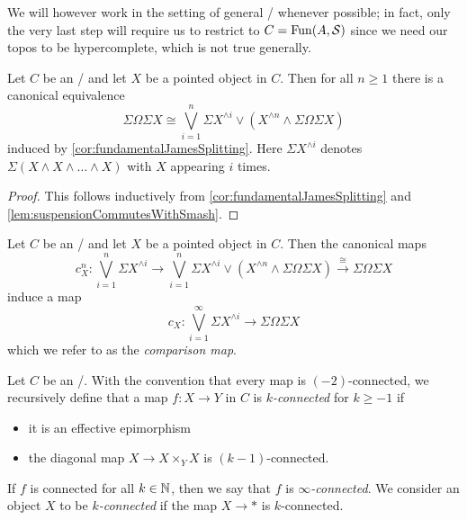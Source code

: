 We will however work in the setting of general \inftytops/ whenever possible; 
in fact, only the very last step will require us to restrict to $C=\operatorname{Fun}(A,\mathcal{S})$ since we need our topos to be hypercomplete, which is not true generally.
\begin{corollary}
    Let $C$ be an \inftytop/ and let $X$ be a pointed object in $C$. 
    Then for all $n\geq 1$ there is a canonical equivalence
    \begin{equation*}
        \Sigma\Omega\Sigma X \cong\bigvee\limits_{i=1}^n\Sigma X^{\wedge i}\vee\left(X^{\wedge n}\wedge\Sigma\Omega\Sigma X\right)
    \end{equation*}
    induced by \cref{cor:fundamentalJamesSplitting}.
    Here $\Sigma X^{\wedge i}$ denotes $\Sigma\left(X\wedge X\wedge\ldots\wedge X\right)$ with $X$ appearing $i$ times.
    \begin{proof}
        This follows inductively from \cref{cor:fundamentalJamesSplitting} and \cref{lem:suspensionCommutesWithSmash}.
    \end{proof}
\end{corollary}
\begin{definition}
    Let $C$ be an \inftytop/ and let $X$ be a pointed object in $C$. 
    Then the canonical maps 
    \begin{equation*}
        c_X^n\colon\bigvee\limits_{i=1}^n\Sigma X^{\wedge i}\to\bigvee\limits_{i=1}^n\Sigma X^{\wedge i}\vee\left(X^{\wedge n}\wedge\Sigma\Omega\Sigma X\right)\xrightarrow{\cong}\Sigma\Omega\Sigma X
    \end{equation*}
    induce a map
    \begin{equation*}
        c_X\colon\bigvee\limits_{i=1}^{\infty}\Sigma X^{\wedge i}\to\Sigma\Omega\Sigma X
    \end{equation*}
    which we refer to as the \emph{comparison map}.
\end{definition}
\begin{definition}\label{def:connected}
    Let $C$ be an \inftytop/.
    With the convention that every map is $(-2)$-connected, we recursively define that a map $f\colon X\to Y$ in $C$ is \emph{$k$-connected} for $k\geq -1$ if
    \begin{itemize}
        \item it is an effective epimorphism
        \item the diagonal map $X\to X\times_YX$ is $(k-1)$-connected.
    \end{itemize} 
    If $f$ is connected for all $k\in\mathbb{N}$, then we say that $f$ is \emph{$\infty$-connected}.
    We consider an object $X$ to be \emph{$k$-connected} if the map $X\to *$ is $k$-connected.
\end{definition}
